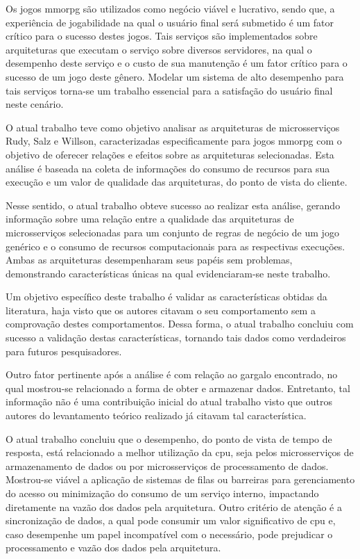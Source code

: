 Os jogos \ac{mmorpg} são utilizados como negócio viável e lucrativo, sendo que, a experiência de jogabilidade na qual o usuário final será submetido é um fator crítico para o sucesso destes jogos.
%
Tais serviços são implementados sobre arquiteturas que executam o serviço sobre diversos servidores, na qual o desempenho deste serviço e o custo de sua manutenção é um fator crítico para o sucesso de um jogo deste gênero.
%
Modelar um sistema de alto desempenho para tais serviços torna-se um trabalho essencial para a satisfação do usuário final neste cenário.


O atual trabalho teve como objetivo analisar as arquiteturas de microsserviços Rudy, Salz e Willson, caracterizadas especificamente para jogos \ac{mmorpg} com o objetivo de oferecer relações e efeitos sobre as arquiteturas selecionadas.
%
Esta análise é baseada na coleta de informações do consumo de recursos para sua execução e um valor de qualidade das arquiteturas, do ponto de vista do cliente.

Nesse sentido, o atual trabalho obteve sucesso ao realizar esta análise, gerando informação sobre uma relação entre a qualidade das arquiteturas de microsserviços selecionadas para um conjunto de regras de negócio de um jogo genérico e o consumo de recursos computacionais para as respectivas execuções.
%
Ambas as arquiteturas desempenharam seus papéis sem problemas, demonstrando características únicas na qual evidenciaram-se neste trabalho.

Um objetivo específico deste trabalho é validar as características obtidas da literatura, haja visto que os autores citavam o seu comportamento sem a comprovação destes comportamentos.
%
Dessa forma, o atual trabalho concluiu com sucesso a validação destas características, tornando tais dados como verdadeiros para futuros pesquisadores.

Outro fator pertinente após a análise é com relação ao gargalo encontrado, no qual mostrou-se relacionado a forma de obter e armazenar dados.
%
Entretanto, tal informação não é uma contribuição inicial do atual trabalho visto que outros autores do levantamento teórico realizado já citavam tal característica.

O atual trabalho concluiu que o desempenho, do ponto de vista de tempo de resposta, está relacionado a melhor utilização da \ac{cpu}, seja pelos microsserviços de armazenamento de dados ou por microsserviços de processamento de dados.
%
Mostrou-se viável a aplicação de sistemas de filas ou barreiras para gerenciamento do acesso ou minimização do consumo de um serviço interno, impactando diretamente na vazão dos dados pela arquitetura.
%
Outro critério de atenção é a sincronização de dados, a qual pode consumir um valor significativo de \ac{cpu} e, caso desempenhe um papel incompatível com o necessário, pode prejudicar o processamento e vazão dos dados pela arquitetura.

